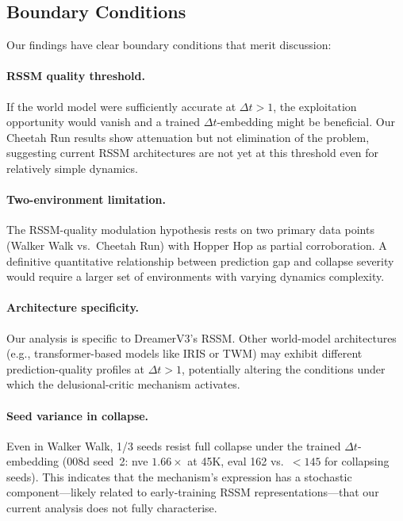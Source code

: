 \documentclass[letterpaper]{article}
\begin{document}
\subsection{Boundary Conditions}
\label{sec:boundary}

Our findings have clear boundary conditions that merit discussion:

\paragraph{RSSM quality threshold.}
If the world model were sufficiently accurate at $\Delta t{>}1$, the exploitation opportunity would vanish and a trained $\Delta t$-embedding might be beneficial.
Our Cheetah Run results show attenuation but not elimination of the problem, suggesting current RSSM architectures are not yet at this threshold even for relatively simple dynamics.

\paragraph{Two-environment limitation.}
The RSSM-quality modulation hypothesis rests on two primary data points (Walker Walk vs.\ Cheetah Run) with Hopper Hop as partial corroboration.
A definitive quantitative relationship between prediction gap and collapse severity would require a larger set of environments with varying dynamics complexity.

\paragraph{Architecture specificity.}
Our analysis is specific to DreamerV3's RSSM.
Other world-model architectures (e.g., transformer-based models like IRIS or TWM) may exhibit different prediction-quality profiles at $\Delta t{>}1$, potentially altering the conditions under which the delusional-critic mechanism activates.

\paragraph{Seed variance in collapse.}
Even in Walker Walk, 1/3 seeds resist full collapse under the trained $\Delta t$-embedding (008d seed~2: nve $1.66\times$ at 45K, eval 162 vs.\ $<145$ for collapsing seeds).
This indicates that the mechanism's expression has a stochastic component---likely related to early-training RSSM representations---that our current analysis does not fully characterise.
\end{document}
